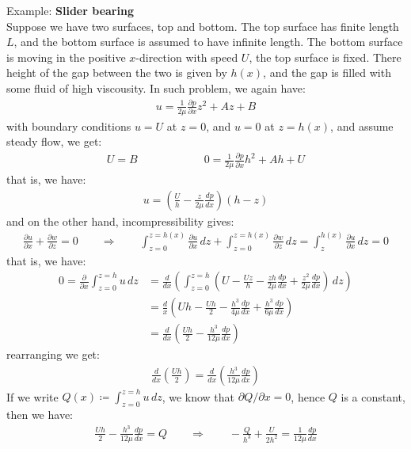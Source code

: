 \documentclass[11pt]{book}
\theoremstyle{break}
\theoremstyle{break}
\newcommand{\pd}{\partial}
\newcommand{\example}{\color{green}Example: \color{black}}
\begin{document}
\example \textbf{Slider bearing}\\
Suppose we have two surfaces, top and bottom. The top surface has finite length $L$, and the bottom surface is assumed to have infinite length. The bottom surface is moving in the positive $x$-direction with speed $U$, the top surface is fixed. There height of the gap between the two is given by $h(x)$, and the gap is filled with some fluid of high viscousity. In such problem, we again have:
\begin{align*}
u = \frac{1}{2\mu}\frac{\pd p}{\pd x}z^2 + Az+B
\end{align*}
with boundary conditions $u = U$ at $z = 0$, and $u = 0$ at $z = h(x)$, and assume steady flow, we get:
\begin{align*}
U = B \qquad\qquad \qquad 0 =\frac{1}{2\mu}\frac{\pd p}{\pd x}h^2 + Ah +U
\end{align*}
that is, we have:
\begin{align*}
u = \left( \frac{U}{h} - \frac{z}{2\mu}\frac{dp}{dx}\right)(h-z)
\end{align*}
and on the other hand, incompressibility gives:
\begin{align*}
\frac{\pd u}{\pd x} + \frac{\pd w}{\pd z} = 0 \qquad \Rightarrow \qquad \int_{z=0}^{z= h(x)}\frac{\pd u}{\pd x}\, dz + \int_{z=0}^{z=h(x)}\frac{\pd w}{\pd z} \, dz = \int_z^{h(x)}\frac{\pd u}{\pd x}\, dz =0
\end{align*}
that is, we have:
\begin{align*}
0 = \frac{\pd}{\pd x}\int_{z=0}^{z=h} u \, dz &= \frac{d}{dx}\left( \int_{z=0}^{z=h} \left( U - \frac{Uz}{h}- \frac{zh}{2\mu}\frac{dp}{dx} +\frac{z^2}{2\mu}\frac{dp}{dx}\right)\, dz \right)\\
&= \frac{d}{x}\left( Uh - \frac{Uh}{2} - \frac{h^3}{4\mu}\frac{dp}{dx} + \frac{h^3}{6\mu}\frac{dp}{dx}\right) \\
&= \frac{d}{dx}\left( \frac{Uh}{2} -\frac{h^3}{12\mu}\frac{dp}{dx}\right)
\end{align*}
rearranging we get:
\begin{align*}
\frac{d}{dx}\left( \frac{Uh}{2}\right) = \frac{d}{dx}\left( \frac{h^3}{12\mu}\frac{dp}{dx}\right) \tag{Reynolds' Equation}
\end{align*}
If we write $Q(x) \coloneqq \int_{z=0}^{z=h} u\, dz$, we know that $\pd Q/\pd x =0$, hence $Q$ is a constant, then we have:
\begin{align*}
\frac{Uh}{2} - \frac{h^3}{12\mu}\frac{dp}{dx} = Q \qquad \Rightarrow \qquad -\frac{Q}{h^3}+\frac{U}{2h^2} = \frac{1}{12\mu}\frac{dp}{dx}
\end{align*}
\end{document}
